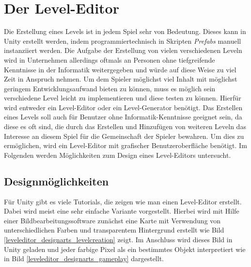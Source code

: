 \section{Der Level-Editor} \label{leveleditor}
Die Erstellung eines Levels ist in jedem Spiel sehr von Bedeutung. Dieses kann in Unity erstellt werden, indem programmiertechnisch in Skripten \textit{Prefabs} manuell instanziiert werden. Die Aufgabe der Erstellung von vielen verschiedenen Leveln wird in Unternehmen allerdings oftmals an Personen ohne tiefgreifende Kenntnisse in der Informatik weitergegeben und würde auf diese Weise zu viel Zeit in Anspruch nehmen. Um dem Spieler möglichst viel Inhalt mit möglichst geringem Entwicklungsaufwand bieten zu können, muss es möglich sein verschiedene Level leicht zu implementieren und diese testen zu können. Hierfür wird entweder ein Level-Editor oder ein Level-Generator benötigt. Das Erstellen eines Levels soll auch für Benutzer ohne Informatik-Kenntnisse geeignet sein, da diese es oft sind, die durch das Erstellen und Hinzufügen von weiteren Leveln das Interesse an diesem Spiel für die Gemeinschaft der Spieler bewahren. Um dies zu ermöglichen, wird ein Level-Editor mit grafischer Benutzeroberfläche benötigt. Im Folgenden werden Möglichkeiten zum Design eines Level-Editors untersucht. 

\subsection{Designmöglichkeiten}
Für Unity gibt es viele Tutorials, die zeigen wie man einen Level-Editor erstellt. Dabei wird meist eine sehr einfache Variante vorgestellt. Hierbei wird mit Hilfe einer Bildbearbeitungssoftware zunächst eine Karte mit Verwendung von unterschiedlichen Farben und transparentem Hintergrund erstellt wie Bild \ref{leveleditor_designarts_levelcreation} zeigt. Im Anschluss wird dieses Bild in Unity geladen und jeder farbige Pixel als ein bestimmtes Objekt interpretiert wie in Bild \ref{leveleditor_designarts_gameplay} dargestellt.

